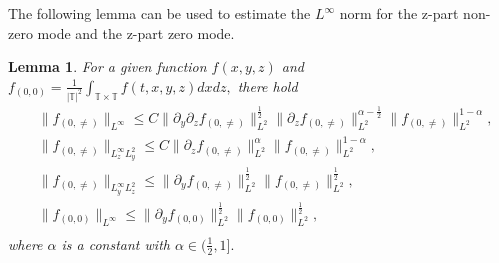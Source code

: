 \documentclass[12pt, reqno]{amsart}
\newtheorem{lemma}{Lemma}[section]
\numberwithin{equation}{section}
\begin{document}
	The following lemma can be used to estimate the $L^{\infty}$ norm for the z-part non-zero mode and the z-part zero mode.		
	\begin{lemma}\label{sob_inf_3}
		For a given function $f(x,y,z)$ and $f_{(0,0)}=\frac{1}{|\mathbb{T}|^2}\int_{\mathbb{T}\times\mathbb{T}}{f}(t,x,y,z)dxdz,$ there hold
		\begin{equation}\label{sob_result_3}
			\begin{aligned}
				&\|f_{(0,\neq)}\|_{L^{\infty}}\leq C\|\partial_y\partial_zf_{(0,\neq)}\|^{\frac{1}{2}}_{L^2}
				\|\partial_zf_{(0,\neq)}\|^{\alpha-\frac{1}{2}}_{L^2}
				\|f_{(0,\neq)}\|^{1-\alpha}_{L^2},\\
				&\|f_{(0,\neq)}\|_{L^{\infty}_{z}L^2_y}\leq C\|\partial_zf_{(0,\neq)}\|_{L^2}^{\alpha}\|f_{(0,\neq)}\|_{L^2}^{1-\alpha},\\
				&\|f_{(0,\neq)}\|_{L^{\infty}_yL^{2}_{z}}
				\leq \|\partial_yf_{(0,\neq)}\|_{L^2}^{\frac{1}{2}}
				\|f_{(0,\neq)}\|_{L^2}^{\frac{1}{2}},\\
				&\|f_{(0,0)}\|_{L^{\infty}}\leq 
				\|\partial_yf_{(0,0)}\|^{\frac{1}{2}}_{L^2}\|f_{(0,0)}\|^{\frac{1}{2}}_{L^2},\\
			\end{aligned}
		\end{equation}	
		where $\alpha$ is a constant with $\alpha\in(\frac{1}{2},1].$
	\end{lemma}
\end{document}
